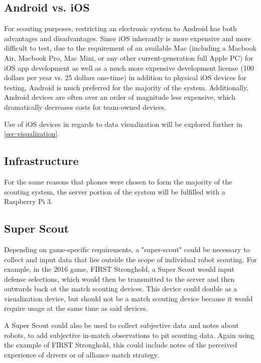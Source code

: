 \documentclass[11pt]{report}
\begin{document}
\subsection{Android vs. iOS}

For scouting purposes, restricting an electronic system to Android has both advantages and disadvantages. Since iOS inherantly is more expensive and more difficult to test, due to the requirement of an available Mac (including a Macbook Air, Macbook Pro, Mac Mini, or any other current-generation full Apple PC) for iOS app development as well as a much more expensive development license (100 dollars per year vs. 25 dollars one-time) in addition to physical iOS devices for testing, Android is much preferred for the majority of the system. Additionally, Android devices are often over an order of magnitude less expensive, which dramatically decreases costs for team-owned devices. \newline

Use of iOS devices in regards to data visualization will be explored further in \autoref{sec:visualization}.

\subsection{Infrastructure}

For the same reasons that phones were chosen to form the majority of the scouting system, the server portion of the system will be fulfilled with a Raspberry Pi 3.

\subsection{Super Scout}

Depending on game-specific requirements, a "super-scout" could be necessary to collect and input data that lies outside the scope of individual robot scouting. For example, in the 2016 game, FIRST Stronghold, a Super Scout would input defense selections, which would then be transmitted to the server and then outwards back ot the match scouting devices. This device could double as a visualization device, but should not be a match scouting device because it would require usage at the same time as said devices.

A Super Scout could also be used to collect subjective data and notes about robots, to add subjective in-match observations to pit scouting data. Again using the example of FIRST Stronghold, this could include notes of the perceived experience of drivers or of alliance match strategy.
\end{document}
